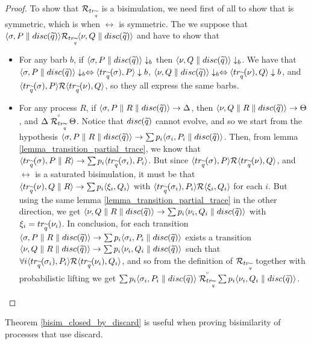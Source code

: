 \begin{proof}
To show that $\mathcal{R}_{tr_{\widetilde{q}}}$ is a bisimulation, we need first of all to show that is symmetric, which is when $\rel$ is symmetric. The we suppose that $\langle\sigma, P \parallel disc(\widetilde{q})\rangle \mathcal{R}_{tr_{\widetilde{q}}} \langle\nu, Q \parallel disc(\widetilde{q})\rangle$ and have to show that \begin{itemize}
\item For any barb $b$, if $\langle\sigma, P \parallel disc(\widetilde{q})\rangle \downarrow_b$ then $\langle\nu, Q \parallel disc(\widetilde{q})\rangle \downarrow_b$. We have that $\langle\sigma, P \parallel disc(\widetilde{q})\rangle \downarrow_b \Leftrightarrow \langle tr_{\widetilde{q}}(\sigma), P\rangle \downarrow b$, $\langle\nu, Q \parallel disc(\widetilde{q})\rangle \downarrow_b \Leftrightarrow \langle tr_{\widetilde{q}}(\nu), Q\rangle \downarrow b$, and 
$\langle tr_{\widetilde{q}}(\sigma), P\rangle \mathcal{R} \langle tr_{\widetilde{q}}(\nu), Q\rangle$, so they all express the same barbs.
\item For any process $R$, if $\langle\sigma, P \parallel R \parallel disc(\widetilde{q})\rangle \rightarrow \Delta$, then $\langle\nu, Q \parallel R \parallel disc(\widetilde{q})\rangle \rightarrow \Theta$, and $\Delta \stackrel{\scriptscriptstyle \circ}{\mathcal{R}_{tr_{\widetilde{q}}}} \Theta$. Notice that $disc(\widetilde{q})$ cannot evolve, and so we start from the hypothesis $\langle\sigma, P \parallel R \parallel disc(\widetilde{q})\rangle \rightarrow \sum p_i \langle\sigma_i, P_i \parallel disc(\widetilde{q})\rangle$. Then, from lemma \ref{lemma_transition_partial_trace}, we know that $\langle tr_{\widetilde{q}}(\sigma), P\parallel R\rangle \rightarrow \sum p_i \langle tr_{\widetilde{q}}(\sigma_i), P_i\rangle$. But since $\langle tr_{\widetilde{q}}(\sigma), P\rangle \mathcal{R} \langle tr_{\widetilde{q}}(\nu), Q\rangle$, and $\rel$ is a saturated bisimulation, it must be that $\langle tr_{\widetilde{q}}(\nu), Q\parallel R\rangle \rightarrow \sum p_i \langle\xi_i, Q_i\rangle$ with $\langle tr_{\widetilde{q}}(\sigma_i), P_i\rangle \mathcal{R} \langle\xi_i, Q_i\rangle$ for each $i$. But using the same lemma \ref{lemma_transition_partial_trace} in the other direction, we get $\langle\nu, Q \parallel R \parallel disc(\widetilde{q})\rangle \rightarrow \sum p_i \langle\nu_i, Q_i \parallel disc(\widetilde{q})\rangle$ with $\xi_i = tr_{\widetilde{q}}(\nu_i)$. In conclusion, for each transition $\langle\sigma, P \parallel R \parallel disc(\widetilde{q})\rangle \rightarrow \sum p_i \langle\sigma_i, P_i \parallel disc(\widetilde{q})\rangle$ exists a transition $\langle\nu, Q \parallel R \parallel disc(\widetilde{q})\rangle \rightarrow \sum p_i \langle\nu_i, Q_i \parallel disc(\widetilde{q})\rangle$ such that $\forall i \langle tr_{\widetilde{q}}(\sigma_i), P_i\rangle \mathcal{R} \langle tr_{\widetilde{q}}(\nu_i), Q_i\rangle$, and so from the definition of $\mathcal{R}_{tr_{\widetilde{q}}}$ together with probabilistic lifting we get $\sum p_i \langle\sigma_i, P_i \parallel disc(\widetilde{q})\rangle \stackrel{\scriptscriptstyle \circ}{\mathcal{R}_{tr_{\widetilde{q}}}} \sum p_i \langle\nu_i, Q_i \parallel disc(\widetilde{q})\rangle$.
\end{itemize}
\end{proof}



Theorem \ref{bisim_closed_by_discard} is useful when proving bisimilarity of processes that use discard.



